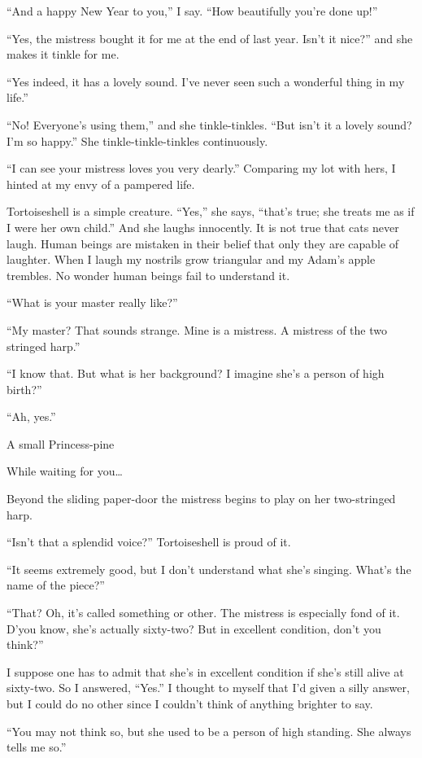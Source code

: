 \documentclass[12pt, openright]{book}
\begin{document}
``And a happy New Year to you,'' I say. ``How beautifully you're done
up!''

``Yes, the mistress bought it for me at the end of last year. Isn't it
nice?'' and she makes it tinkle for me.

``Yes indeed, it has a lovely sound. I've never seen such a wonderful
thing in my life.''

``No! Everyone's using them,'' and she tinkle-tinkles. ``But isn't it a
lovely sound? I'm so happy.'' She tinkle-tinkle-tinkles continuously.

``I can see your mistress loves you very dearly.'' Comparing my lot with
hers, I hinted at my envy of a pampered life.

Tortoiseshell is a simple creature. ``Yes,'' she says, ``that's true;
she treats me as if I were her own child.'' And she laughs innocently.
It is not true that cats never laugh. Human beings are mistaken in their
belief that only they are capable of laughter. When I laugh my nostrils
grow triangular and my Adam's apple trembles. No wonder human beings
fail to understand it.

``What is your master really like?''

``My master? That sounds strange. Mine is a mistress. A mistress of the
two stringed harp.''

``I know that. But what is her background? I imagine she's a person of
high birth?''

``Ah, yes.''

A small Princess-pine

While waiting for you\ldots{}

Beyond the sliding paper-door the mistress begins to play on her
two-stringed harp.

``Isn't that a splendid voice?'' Tortoiseshell is proud of it.

``It seems extremely good, but I don't understand what she's singing.
What's the name of the piece?''

``That? Oh, it's called something or other. The mistress is especially
fond of it. D'you know, she's actually sixty-two? But in excellent
condition, don't you think?''

I suppose one has to admit that she's in excellent condition if she's
still alive at sixty-two. So I answered, ``Yes.'' I thought to myself
that I'd given a silly answer, but I could do no other since I couldn't
think of anything brighter to say.

``You may not think so, but she used to be a person of high standing.
She always tells me so.''
\end{document}
